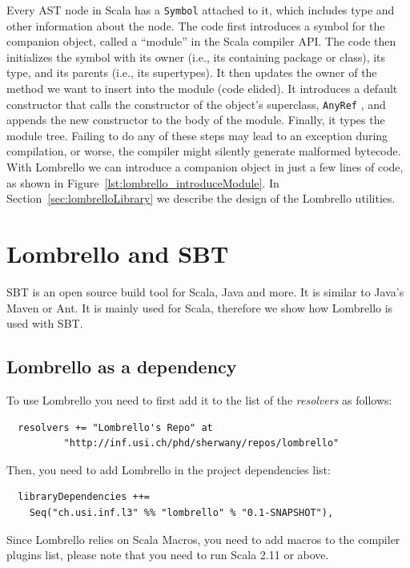 \documentclass{article}
\renewcommand\c[1]{
  \ifmmode
    \text{#1}
  \else
    \lstinline{#1}
  \fi
}
\begin{document}
Every AST node in Scala has a \c{Symbol} attached to it, which includes type
and other information about the node.  The code first introduces a symbol for
the companion object, called a ``module'' in the Scala compiler API.  The code
then initializes the symbol with its owner (i.e., its containing package or
class), its type, and its parents (i.e., its supertypes).  It then updates the
owner of the method we want to insert into the module (code elided).  It
introduces a default constructor that calls the constructor of the object's
superclass, \c{AnyRef}, and appends the new constructor to the body of the
module.  Finally, it types the module tree.  Failing to do any of these steps
may lead to an exception during compilation, or worse, the compiler might
silently generate malformed bytecode. With Lombrello we can introduce a
companion object in just a few lines of code, as shown in
Figure~\ref{lst:lombrello_introduceModule}.  In
Section~\ref{sec:lombrelloLibrary} we describe the design of the Lombrello 
utilities.


\section{Lombrello and SBT}
SBT is an open source build tool for Scala, Java and more. It is similar to
Java's Maven or Ant. It is mainly used for Scala, therefore we show how
Lombrello is used with SBT. 


\subsection{Lombrello as a dependency}
To use Lombrello you need to first add it to the list of the \emph{resolvers}
as follows: 

\begin{verbatim}
  resolvers += "Lombrello's Repo" at 
          "http://inf.usi.ch/phd/sherwany/repos/lombrello"
\end{verbatim}


\noindent
Then, you need to add Lombrello in the project dependencies list:

\begin{verbatim}
  libraryDependencies ++= 
    Seq("ch.usi.inf.l3" %% "lombrello" % "0.1-SNAPSHOT"),
\end{verbatim}


\noindent
Since Lombrello relies on Scala Macros, you need to add macros to the compiler
plugins list, please note that you need to run Scala 2.11 or above.
\end{document}

